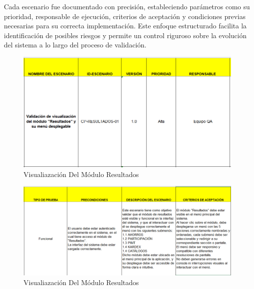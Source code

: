 \documentclass[12pt,letterpaper,spanish, xcolor=table]{report}
\numberwithin{figure}{subsection}
\begin{document}
	Cada escenario fue documentado con precisión, estableciendo parámetros como su prioridad, responsable de ejecución, criterios de aceptación y condiciones previas necesarias para su correcta implementación. Este enfoque estructurado facilita la identificación de posibles riesgos y permite un control riguroso sobre la evolución del sistema a lo largo del proceso de validación.\\
	
	\begin{figure}[H]
		\centering
		\includegraphics[width=1.0\textwidth]
		{Imagenes/CenterPoint/EResultado.png}
		\caption{Visualiazación Del Módulo Resultados}\label{a3}
	\end{figure}
	
	\begin{figure}[H]
		\centering
		\includegraphics[width=1.0\textwidth]
		{Imagenes/CenterPoint/EResultado2.png}
		\caption{Visualiazación Del Módulo Resultados}\label{a3}
	\end{figure}
	
\end{document}
